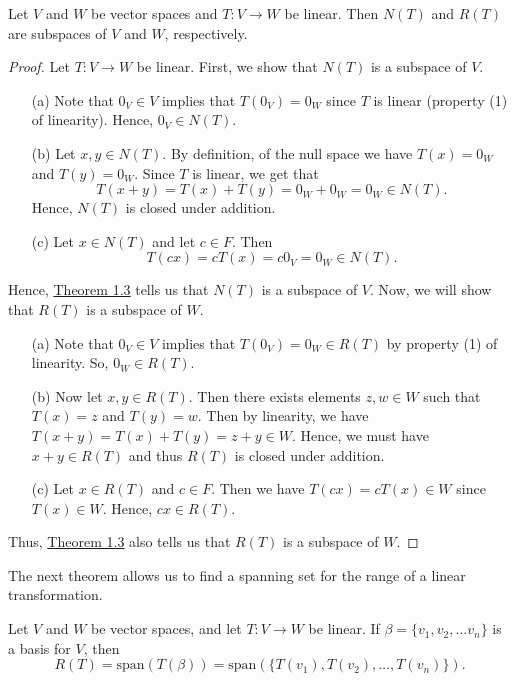 \begin{theorem}
    Let \( V  \) and \( W  \) be vector spaces and \( T: V \to W  \) be linear. Then \( N(T) \) and \( R(T) \) are subspaces of \( V  \) and \( W  \), respectively.
\end{theorem}
\begin{proof}
    Let \( T: V \to W   \) be linear. First, we show that \( N(T) \) is a subspace of \( V  \). 
    \begin{enumerate}
        \item[(a)] Note that \( 0_{V} \in V  \) implies that \( T(0_{V}) = 0_{W}  \) since \( T  \) is linear (property (1) of linearity). Hence, \( 0_{V} \in N(T)  \).
        \item[(b)] Let \( x, y \in N(T) \). By definition, of the null space we have \( T(x) = 0_{W}  \) and \( T(y) = 0_{W} \). Since \( T  \) is linear, we get that
            \[  T(x+y) = T(x) + T(y) = 0_{W} + 0_{W} = 0_{W} \in N(T). \]
        Hence, \( N(T) \) is closed under addition.
        \item[(c)] Let \( x \in N(T)  \) and let \( c \in F  \). Then 
            \[ T(cx) = cT(x) = c 0_{V} = 0_{W} \in N(T).  \]
    \end{enumerate}
    Hence, {\hyperref[Subspaces]{Theorem 1.3}} tells us that \( N(T) \) is a subspace of \( V  \).
    Now, we will show that \( R(T) \) is a subspace of \( W  \).
    \begin{enumerate}
        \item[(a)] Note that \( 0_{V} \in V  \) implies that \( T(0_{V}) = 0_{W} \in R(T) \) by property (1) of linearity. So, \( 0_{W} \in R(T) \).
        \item[(b)] Now let \( x,y \in R(T)  \). Then there exists elements \( z, w \in W   \) such that \( T(x) = z  \) and \( T(y) = w  \). Then by linearity, we have \( T(x+y) = T(x) + T(y) = z + y \in W   \). Hence, we must have \( x + y \in R(T) \) and thus \( R(T)  \) is closed under addition.
        \item[(c)] Let \( x \in R(T)  \) and \( c \in F \). Then we have \( T(cx) = c T(x) \in W  \) since \( T(x) \in W  \). Hence, \( cx \in R(T) \).
    \end{enumerate}
    Thus, {\hyperref[Subspaces]{Theorem 1.3}} also tells us that \( R(T)  \) is a subspace of \( W  \).
\end{proof}

The next theorem allows us to find a spanning set for the range of a linear transformation.

\begin{theorem}\label{Spanning set for R(T)}
    Let \( V  \) and \( W  \) be vector spaces, and let \( T:V \to W  \) be linear. If \( \beta = \{ v_{1}, v_{2}, \dots v_{n} \}  \) is a basis for \( V  \), then   
    \[  R(T) = \text{span}(T(\beta)) = \text{span}(\{ T(v_{1}), T(v_{2}) , \dots, T(v_{n}) \} ). \]
\end{theorem}

